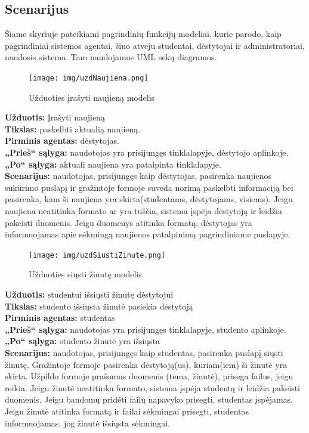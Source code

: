\documentclass{VUMIFPSkursinis}
\begin{document}
\subsection{Scenarijus}
Šiame skyriuje pateikiami pagrindinių funkcijų modeliai, kurie parodo, kaip pagrindiniai sistemos agentai, šiuo atveju studentai, dėstytojai ir administratoriai, naudosis sistema. Tam naudojamos UML sekų diagramos.
\begingroup
\begin{figure}[H]
\centering
\texttt{[image: img/uzdNaujiena.png]}
\caption{Užduoties įrašyti naujieną modelis}
\label{fig:rnaujiena}
\end{figure}
\setlength{\parindent}{0pt}\textbf{Užduotis: } Įrašyti naujieną\\
\textbf{Tikslas: } paskelbti aktualią naujieną.\\
\textbf{Pirminis agentas: } dėstytojas.\\
\textbf{„Prieš“ sąlyga: } naudotojas yra prisijungęs tinklalapyje, dėstytojo aplinkoje.\\
\textbf{„Po“ sąlyga: } aktuali naujiena yra patalpinta tinklalapyje.\\
\textbf{Scenarijus: } naudotojas, prisijungęs kaip dėstytojas, pasirenka naujienos sukūrimo puslapį ir gražintoje formoje suveda norimą paskelbti informaciją bei pasirenka, kam ši naujiena yra skirta(studentams, dėstytojams, visiems). Jeigu naujiena neatitinka formato ar yra tuščia, sistema įspėja dėstytoją ir leidžia pakeisti duomenis. Jeigu duomenys atitinka formatą, dėstytojas yra informuojamas apie sėkmingą naujienos patalpinimą pagrindiniame puslapyje.
\begin{figure}[H]
\centering
\texttt{[image: img/uzdSiustiZinute.png]}
\caption{Užduoties siųsti žinutę modelis}
\label{fig:zinute}
\end{figure}
\textbf{Užduotis: } studentui išsiųsti žinutę dėstytojui\\
\textbf{Tikslas: } studento išsiųsta žinutė pasiekia dėstytoją\\
\textbf{Pirminis agentas: } studentas\\
\textbf{„Prieš“ sąlyga: } naudotojas yra prisijungęs tinklalapyje, studento aplinkoje.\\
\textbf{„Po“ sąlyga: } studento žinutė yra išsiųsta\\
\textbf{Scenarijus: } naudotojas, prisijungęs kaip studentas, pasirenka puslapį siųsti žinutę. Gražintoje formoje pasirenka dėstytoją(us), kuriam(iem) ši žinutė yra skirta. Užpildo formoje prašomus duomenis (tema, žinutė), prisega failus, jeigu reikia. Jeigu žinutė neatitinka formato, sistema įspėja studentą ir leidžia pakeisti duomenis. Jeigu bandomų pridėti failų napavyko prisegti, studentas įspėjamas. Jeigu žinutė atitinka formatą ir failai sėkmingai prisegti, studentas informuojamas, jog žinutė išsiųsta sėkmingai.
\end{document}
